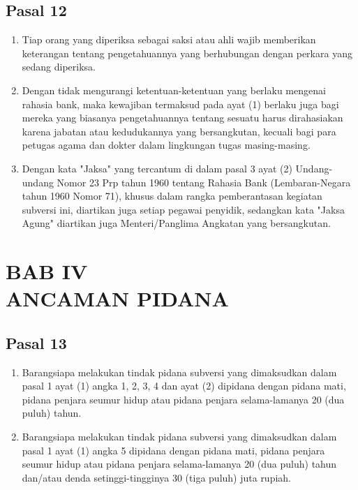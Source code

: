 \documentclass{article}
\begin{document}
\subsection*{\centering{}Pasal 12}

\begin{enumerate}
\item Tiap orang yang diperiksa sebagai saksi atau ahli wajib memberikan keterangan tentang
pengetahuannya yang berhubungan dengan perkara yang sedang diperiksa.
\item Dengan tidak mengurangi ketentuan-ketentuan yang berlaku mengenai rahasia bank, maka kewajiban
termaksud pada ayat (1) berlaku juga bagi mereka yang biasanya pengetahuannya tentang sesuatu
harus dirahasiakan karena jabatan atau kedudukannya yang bersangkutan, kecuali bagi para petugas
agama dan dokter dalam lingkungan tugas masing-masing.
\item Dengan kata "Jaksa" yang tercantum di dalam pasal 3 ayat (2) Undang-undang Nomor 23 Prp tahun
1960 tentang Rahasia Bank (Lembaran-Negara tahun 1960 Nomor 71), khusus dalam rangka
pemberantasan kegiatan subversi ini, diartikan juga setiap pegawai penyidik, sedangkan kata "Jaksa
Agung" diartikan juga Menteri/Panglima Angkatan yang bersangkutan.
\end{enumerate}

\section*{\centering{}BAB IV\\ANCAMAN PIDANA}

\subsection*{\centering{}Pasal 13}

\begin{enumerate}
\item Barangsiapa melakukan tindak pidana subversi yang dimaksudkan dalam pasal 1 ayat (1) angka 1, 2,
3, 4 dan ayat (2) dipidana dengan pidana mati, pidana penjara seumur hidup atau pidana penjara
selama-lamanya 20 (dua puluh) tahun.
\item Barangsiapa melakukan tindak pidana subversi yang dimaksudkan dalam pasal 1 ayat (1) angka 5
dipidana dengan pidana mati, pidana penjara seumur hidup atau pidana penjara selama-lamanya 20
(dua puluh) tahun dan/atau denda setinggi-tingginya 30 (tiga puluh) juta rupiah.
\end{enumerate}
\end{document}
